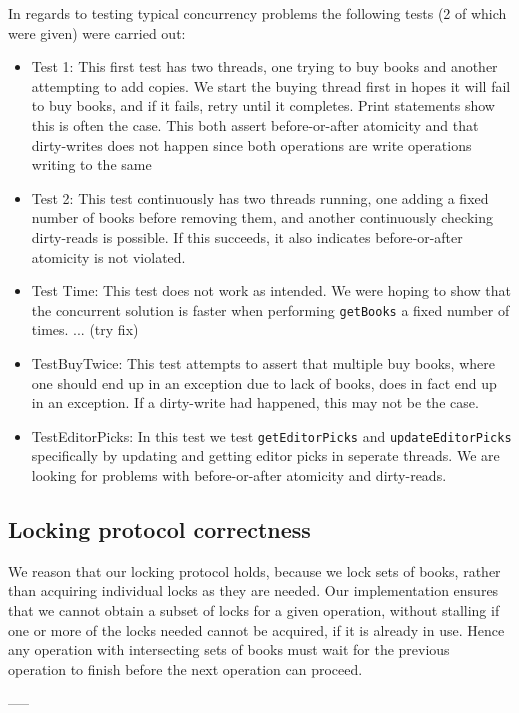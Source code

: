 In regards to testing typical concurrency problems the following tests (2 of which were given) were carried out:
\begin{itemize}
    \item Test 1: This first test has two threads, one trying to buy books and another attempting to add copies. We start the buying thread first in hopes it will fail to buy books, and if it fails, retry until it completes. Print statements show this is often the case. This both assert before-or-after atomicity and that dirty-writes does not happen since both operations are write operations writing to the same
    \item Test 2: This test continuously has two threads running, one adding a fixed number of books before removing them, and another continuously checking dirty-reads is possible. If this succeeds, it also indicates before-or-after atomicity is not violated.
    \item Test Time: This test does not work as intended. We were hoping to show that the concurrent solution is faster when performing {\tt getBooks} a fixed number of times. ... (try fix)
    \item TestBuyTwice: This test attempts to assert that multiple buy books, where one should end up in an exception due to lack of books, does in fact end up in an exception. If a dirty-write had happened, this may not be the case.
    \item TestEditorPicks: In this test we test {\tt getEditorPicks} and {\tt updateEditorPicks} specifically by updating and getting editor picks in seperate threads. We are looking for problems with before-or-after atomicity and dirty-reads.
\end{itemize}

\subsection{Locking protocol correctness}
We reason that our locking protocol holds, because we lock sets of books, rather
than acquiring individual locks as they are needed. Our implementation ensures
that we cannot obtain a subset of locks for a given operation, without stalling
if one or more of the locks needed cannot be acquired, if it is already in use.
Hence any operation with intersecting sets of books must wait for the previous
operation to finish before the next operation can proceed.

-----

